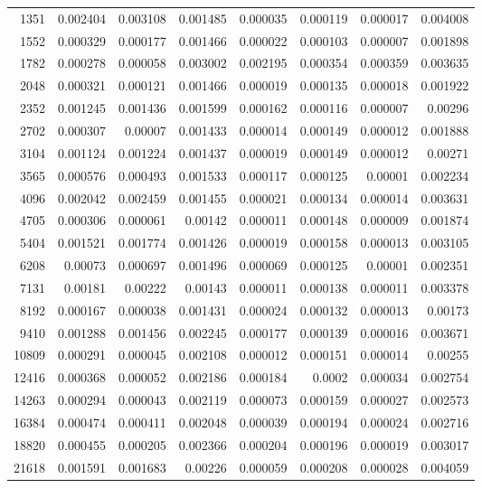 \begin{longtable}{r r r r r r r r}
1351 & 0.002404 & 0.003108 & 0.001485 & 0.000035 & 0.000119 & 0.000017 & 0.004008 \\
1552 & 0.000329 & 0.000177 & 0.001466 & 0.000022 & 0.000103 & 0.000007 & 0.001898 \\
1782 & 0.000278 & 0.000058 & 0.003002 & 0.002195 & 0.000354 & 0.000359 & 0.003635 \\
2048 & 0.000321 & 0.000121 & 0.001466 & 0.000019 & 0.000135 & 0.000018 & 0.001922 \\
2352 & 0.001245 & 0.001436 & 0.001599 & 0.000162 & 0.000116 & 0.000007 & 0.00296 \\
2702 & 0.000307 & 0.00007 & 0.001433 & 0.000014 & 0.000149 & 0.000012 & 0.001888 \\
3104 & 0.001124 & 0.001224 & 0.001437 & 0.000019 & 0.000149 & 0.000012 & 0.00271 \\
3565 & 0.000576 & 0.000493 & 0.001533 & 0.000117 & 0.000125 & 0.00001 & 0.002234 \\
4096 & 0.002042 & 0.002459 & 0.001455 & 0.000021 & 0.000134 & 0.000014 & 0.003631 \\
4705 & 0.000306 & 0.000061 & 0.00142 & 0.000011 & 0.000148 & 0.000009 & 0.001874 \\
5404 & 0.001521 & 0.001774 & 0.001426 & 0.000019 & 0.000158 & 0.000013 & 0.003105 \\
6208 & 0.00073 & 0.000697 & 0.001496 & 0.000069 & 0.000125 & 0.00001 & 0.002351 \\
7131 & 0.00181 & 0.00222 & 0.00143 & 0.000011 & 0.000138 & 0.000011 & 0.003378 \\
8192 & 0.000167 & 0.000038 & 0.001431 & 0.000024 & 0.000132 & 0.000013 & 0.00173 \\
9410 & 0.001288 & 0.001456 & 0.002245 & 0.000177 & 0.000139 & 0.000016 & 0.003671 \\
10809 & 0.000291 & 0.000045 & 0.002108 & 0.000012 & 0.000151 & 0.000014 & 0.00255 \\
12416 & 0.000368 & 0.000052 & 0.002186 & 0.000184 & 0.0002 & 0.000034 & 0.002754 \\
14263 & 0.000294 & 0.000043 & 0.002119 & 0.000073 & 0.000159 & 0.000027 & 0.002573 \\
16384 & 0.000474 & 0.000411 & 0.002048 & 0.000039 & 0.000194 & 0.000024 & 0.002716 \\
18820 & 0.000455 & 0.000205 & 0.002366 & 0.000204 & 0.000196 & 0.000019 & 0.003017 \\
21618 & 0.001591 & 0.001683 & 0.00226 & 0.000059 & 0.000208 & 0.000028 & 0.004059 \\

\end{longtable}
